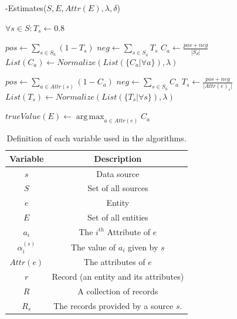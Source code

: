 \documentclass{acm_proc_article-sp}
\DeclareMathOperator*{\argmax}{arg\,max}
\begin{document}
\begin{algorithm}[H]
\caption{-Estimates($S, E, Attr(E), \lambda, \delta$)}
\label{alg:2e} 
\begin{algorithmic}[1]
\State $\forall s \in S: T_s \gets 0.8$

			\State $pos \gets \sum_{s\in S_a}{(1- T_s)}$
			\State $neg \gets \sum_{s\in S_{\overline a}}{T_s}$ 
			\State $C_a \gets \frac{pos + neg}{\rvert S_d \rvert}$ 
		\EndFor
	\EndFor
	\State $List(C_a) \gets Normalize(List(\{C_a \rvert \forall a\}),\lambda)$

		\State $pos \gets \sum_{a\in Attr(s)}{(1- C_a)}$
		\State $neg \gets \sum_{s\in S_{\overline a}}{C_a}$ 
		\State $T_s \gets \frac{pos + neg}{\rvert Attr(e)_s \rvert}$ 
	\EndFor
	\State $List(T_s) \gets Normalize(List(\{T_s \rvert \forall s\}),\lambda)$

		\State $trueValue(E) \gets \argmax_{a\in Attr(e)}C_a$
	\EndFor

\EndWhile

\end{algorithmic}
\end{algorithm}  

\begin{table}
\centering
\begin{tabular}{|c|c|}
\hline
Variable & Description  \\
\hline
$s$ & Data source \\
$S$ & Set of all sources  \\
$e$ & Entity \\
$E$ & Set of all entities \\
$a_i$ & The $i^{th}$ Attribute of $e$ \\
$\alpha_i^{(s)}$ & The value of $a_i$ given by $s$ \\
$Attr(e)$ & The attributes of $e$ \\
$r$ & Record (an entity and its attributes) \\
$R$ & A collection of records \\
$R_s$ & The records provided by a source $s$. \\
\hline
\end{tabular}
\caption{Definition of each variable used in the algorithms.}
\label{tbl:vars}
\end{table}
\end{document}
